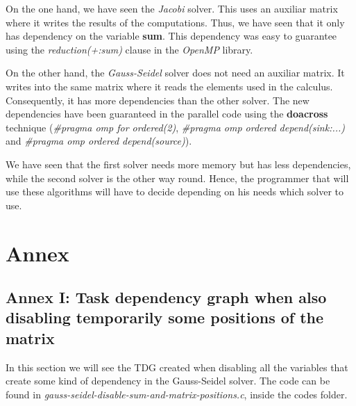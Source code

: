 \documentclass[12pt, a4paper]{article}
\begin{document}
On the one hand, we have seen the \textit{Jacobi} solver. This uses an auxiliar matrix where it writes the results of the computations. Thus, we have seen that it only has dependency on the variable \textbf{sum}. This dependency was easy to guarantee using the \textit{reduction(+:sum)} clause in the \textit{OpenMP} library.

On the other hand, the \textit{Gauss-Seidel} solver does not need an auxiliar matrix. It writes into the same matrix where it reads the elements used in the calculus. Consequently, it has more dependencies than the other solver. The new dependencies have been guaranteed in the parallel code using the \textbf{doacross} technique (\textit{\#pragma omp for ordered(2)}, \textit{\#pragma omp ordered depend(sink:...)} and \textit{\#pragma omp ordered depend(source)}).

We have seen that the first solver needs more memory but has less dependencies, while the second solver is the other way round. Hence, the programmer that will use these algorithms will have to decide depending on his needs which solver to use.

\newpage

\section{Annex}
\subsection{Annex I: Task dependency graph when also disabling temporarily some positions of the matrix}

In this section we will see the TDG created when disabling all the variables that create some kind of dependency in the Gauss-Seidel solver. The code can be found in \textit{gauss-seidel-disable-sum-and-matrix-positions.c}, inside the codes folder.
\end{document}
